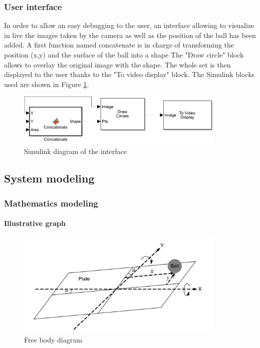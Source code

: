 \subsubsection{User interface}
In order to allow an easy debugging to the user, an interface allowing to visualize in live the images taken by the camera as well as the position of the ball has been added.\newline
A first function named concatenate is in charge of transforming the position (x,y) and the surface of the ball into a shape\newline
The "Draw circle" block allows to overlay the original image with the shape.\newline
The whole set is then displayed to the user thanks to the "To video display" block.\newline
The Simulink blocks used are shown in Figure \ref{Simulink diagram of the interface}.
  \begin{center}
    \begin{figure}[ht!]
        \centering
        \includegraphics[width=10cm, keepaspectratio]{imports/IHM_simulink.png}
        \caption{Simulink diagram of the interface}
        \label{Simulink diagram of the interface}
    \end{figure}
\end{center}
\subsection{System modeling}

    \subsubsection{Mathematics modeling}\label{System modeling}

    \paragraph{Illustrative graph}
\begin{center}
      \begin{figure}[h]
    \centering
    \includegraphics[width=10cm]{imports/Captura.jpg}
    \caption{Free body diagram}
        \label{Free body diagram figure}
    \end{figure}
\end{center}


